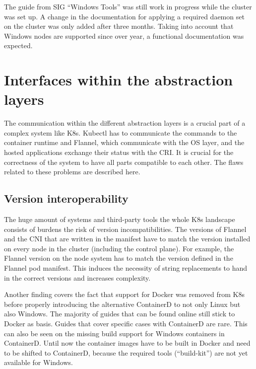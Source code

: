 
The guide from \ac{SIG} \enquote{Windows Tools} was still work in progress while the cluster was set up. A change in the documentation for applying a required daemon set on the cluster was only added after three months. Taking into account that Windows nodes are supported since over year, a functional documentation was expected.

\section{Interfaces within the abstraction layers}
The communication within the different abstraction layers is a crucial part of a complex system like \ac{K8s}. Kubectl has to communicate the commands to the container runtime and Flannel, which communicate with the \ac{OS} layer, and the hosted applications exchange their status with the \ac{CRI}. 
It is crucial for the correctness of the system to have all parts compatible to each other. The flaws related to these problems are described here. 

\subsection{Version interoperability}
The huge amount of systems and third-party tools the whole \ac{K8s} landscape consists of burdens the risk of version incompatibilities. 
The versions of Flannel and the \ac{CNI} that are written in the manifest have to match the version installed on every node in the cluster (including the control plane). For example, the Flannel version on the node system has to match the version defined in the Flannel pod manifest. This induces the necessity of string replacements to hand in the correct versions and increases complexity.

Another finding covers the fact that support for Docker was removed from \ac{K8s} before properly introducing the alternative ContainerD to not only Linux but also \ac{Windows}. The majority of guides that can be found online still stick to Docker as basis. Guides that cover specific cases with ContainerD are rare.
This can also be seen on the missing build support for \ac{Windows} containers in ContainerD. Until now the container images have to be built in Docker and need to be shifted to ContainerD, because the required tools (\enquote{build-kit}) are not yet available for \ac{Windows}\cite{Microsoft.20221225}.

